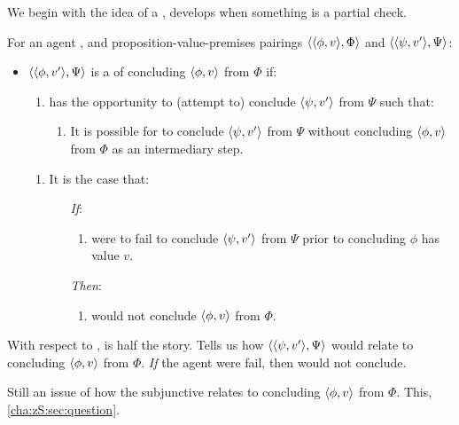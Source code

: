 \begin{note}[\requ{3}]
  We begin with the idea of a \requ{}, develops when something is a partial check.

  \begin{idea}[A \requ{0}]
    \label{idea:requ}
    For an agent \vAgent{}, and proposition-value-premises pairings \(\langle \langle \phi, v \rangle, \Phi \rangle\) and \(\langle \langle \psi, v' \rangle, \Psi \rangle\):

    \begin{itemize}
    \item
      \(\langle \langle \phi, v' \rangle, \Psi \rangle\) is a \emph{\requ{}} of concluding \(\langle \phi, v \rangle\) from \(\Phi\) if:
      \begin{enumerate}[label=\alph*., ref=\named{R:\alph*}]
      \item
        \label{idea:requ:pool}
        \vAgent{} has the opportunity to (attempt to) conclude \(\langle \psi, v' \rangle\) from \(\Psi\) such that:
        \begin{enumerate}[label=\roman*., ref=\named{R:a.\roman*}]
        \item
          \label{idea:requ:pool:int}
          It is possible for \vAgent{} to conclude \(\langle \psi, v' \rangle\) from \(\Psi\) without concluding \(\langle \phi, v \rangle\) from \(\Phi\) as an intermediary step.
        \end{enumerate}
      \end{enumerate}

      \begin{enumerate}[label=\alph*., ref=\named{R:\alph*}, resume]
      \item
        \label{idea:requ:nPsi-nPhi}
        It is the case that:
        \begin{enumerate}
        \item[\emph{If}:]
          \begin{enumerate}[label=\roman*., ref=\named{R:b.\roman*}]
          \item
            \vAgent{} were to fail to conclude \(\langle \psi, v' \rangle\) from \(\Psi\) prior to concluding \(\phi\) has value \(v\).
          \end{enumerate}
        \item[\emph{Then}:]
          \begin{enumerate}[label=\roman*., ref=\named{R:b.\roman*}, resume]
          \item
            \vAgent{} would not conclude \(\langle \phi, v \rangle\) from \(\Phi\).
          \end{enumerate}
        \end{enumerate}
      \end{enumerate}
    \end{itemize}
    \vspace{-\baselineskip}
  \end{idea}

  With respect to , \requ{} is half the story.
  Tells us how \(\langle \langle \psi, v' \rangle, \Psi \rangle\) would relate to concluding \(\langle \phi, v \rangle\) from \(\Phi\).
  \emph{If} the agent were fail, then would not conclude.

  Still an issue of how the subjunctive relates to concluding \(\langle \phi, v \rangle\) from \(\Phi\).
  This, \autoref{cha:zS:sec:question}.
\end{note}

